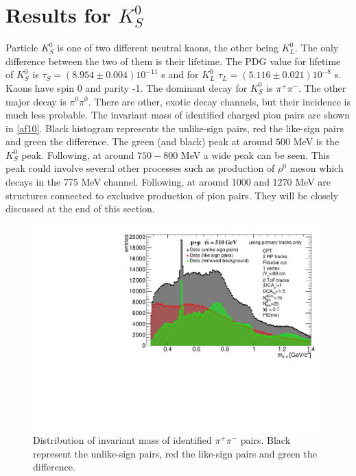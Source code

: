 \section{Results for $K^0_S$}
\label{K0s}
Particle $K^0_S$ is one of two different neutral kaons, the other being $K^0_L$. The only difference between the two of them is their lifetime. The PDG value for lifetime of $K^0_S$ is $\tau_S = (8.954 \pm 0.004)10^{-11}$ s and for $K^0_L$ $\tau_L = (5.116 \pm 0.021)10^{-8}$ s. Kaons have spin 0 and parity -1. The dominant decay for $K^0_S$ is $\pi^+ \pi^-$. The other major decay is $\pi^0 \pi^0$. There are other, exotic decay channels, but their incidence is much less probable\cite{zyla}.
\newline
The invariant mass of identified charged pion pairs are shown in \autoref{af10}. Black histogram represents the unlike-sign pairs, red the like-sign pairs and green the difference. The green (and black) peak at around $500$ MeV is the $K^0_S$ peak. Following, at around $750-800$ MeV a wide peak can be seen. This peak could involve several other processes such as production of $\rho^0$ meson which decays in the 775 MeV channel. Following, at around 1000  and 1270 MeV are structures connected to exclusive production of pion pairs. They will be closely discussed at the end of this section.
\FloatBarrier
\begin{figure}[ht]
    \centering
    \includegraphics[width=1\textwidth]{figures/invMassLikeUnlikeK0s.pdf}
    \caption[Distribution of invariant mass of $\pi^+ \pi^-$ pairs]{Distribution of invariant mass of identified $\pi^+ \pi^-$ pairs. Black represent the unlike-sign pairs, red the like-sign pairs and green the difference.}
    \label{af10}
\end{figure}
